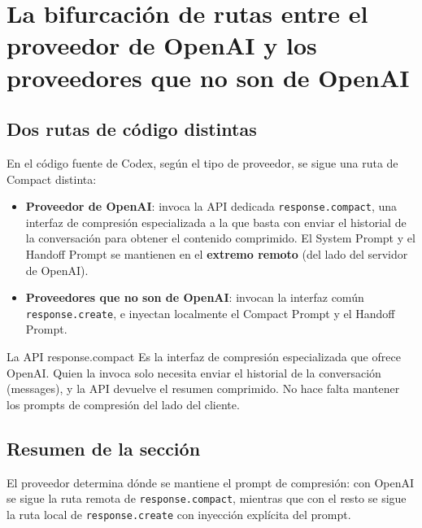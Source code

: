 \section{La bifurcación de rutas entre el proveedor de OpenAI y los proveedores que no son de OpenAI}

\subsection{Dos rutas de código distintas}

En el código fuente de Codex, según el tipo de proveedor, se sigue una ruta de Compact distinta:

\begin{itemize}
    \item \textbf{Proveedor de OpenAI}: invoca la API dedicada \texttt{response.compact}, una interfaz de compresión especializada a la que basta con enviar el historial de la conversación para obtener el contenido comprimido. El System Prompt y el Handoff Prompt se mantienen en el \textbf{extremo remoto} (del lado del servidor de OpenAI).
    \item \textbf{Proveedores que no son de OpenAI}: invocan la interfaz común \texttt{response.create}, e inyectan localmente el Compact Prompt y el Handoff Prompt.
\end{itemize}

\begin{knowledgebox}{La API response.compact}
Es la interfaz de compresión especializada que ofrece OpenAI. Quien la invoca solo necesita enviar el historial de la conversación (messages), y la API devuelve el resumen comprimido. No hace falta mantener los prompts de compresión del lado del cliente.
\end{knowledgebox}

\subsection{Resumen de la sección}

El proveedor determina dónde se mantiene el prompt de compresión: con OpenAI se sigue la ruta remota de \texttt{response.compact}, mientras que con el resto se sigue la ruta local de \texttt{response.create} con inyección explícita del prompt.

